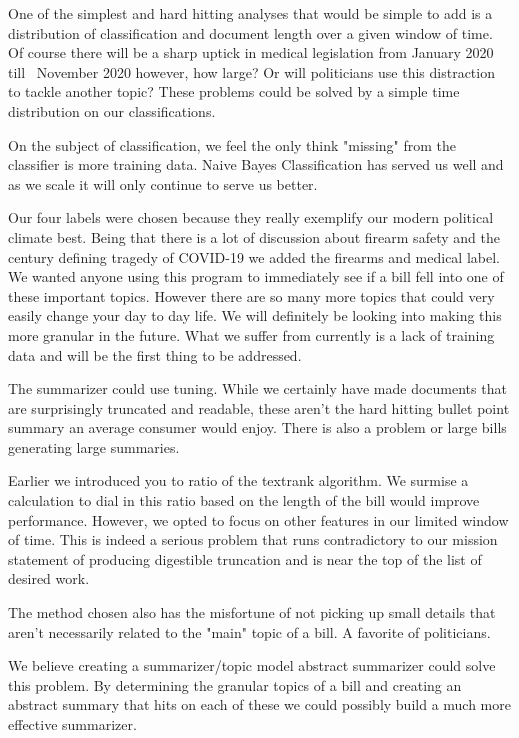 \documentclass[11pt,a4paper]{article}
\begin{document}
One of the simplest and hard hitting analyses that would be simple to add is a distribution of classification and document length over a given window of time. Of course there will be a sharp uptick in medical legislation from January 2020 till ~November 2020 however, how large? Or will politicians use this distraction to tackle another topic? These problems could be solved by a simple time distribution on our classifications.
 
 On the subject of classification, we feel the only think "missing" from the classifier is more training data. Naive Bayes Classification has served us well and as we scale it will only continue to serve us better.
 
 Our four labels were chosen because they really exemplify our modern political climate best. Being that there is a lot of discussion about firearm safety and the century defining tragedy of COVID-19 we added the firearms and medical label. We wanted anyone using this program to immediately see if a bill fell into one of these important topics. However there are so many more topics that could very easily change your day to day life. We will definitely be looking into making this more granular in the future. What we suffer from currently is a lack of training data and will be the first thing to be addressed. 

The summarizer could use tuning. While we certainly have made documents that are surprisingly truncated and readable, these aren't the hard hitting bullet point summary an average consumer would enjoy. There is also a problem or large bills generating large summaries. 

Earlier we introduced you to ratio of the textrank algorithm. We surmise a calculation to dial in this ratio based on the length of the bill would improve performance. However, we opted to focus on other features in our limited window of time. This is indeed a serious problem that runs contradictory to our mission statement of producing digestible truncation and is near the top of the list of desired work.

The method chosen also has the misfortune of not picking up small details that aren't necessarily related to the "main" topic of a bill. A favorite of politicians. 

We believe creating a summarizer/topic model abstract summarizer could solve this problem. By determining the granular topics of a bill and creating an abstract summary that hits on each of these we could possibly build a much more effective summarizer. 
\end{document}
